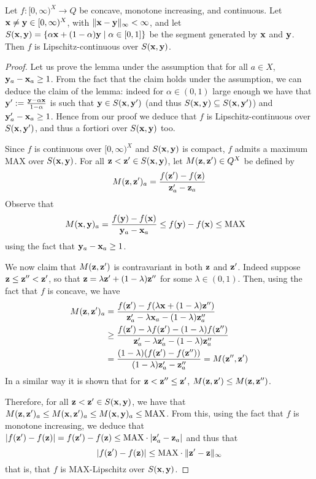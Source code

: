 \begin{lemma}\label{lm:mainLip}
Let $f: [0,\infty)^{X}\to Q$ be concave, monotone increasing, and continuous.  
Let $\mathbf{x}\neq \mathbf{y}\in [0,\infty)^{X}$, with $\|\mathbf{x}-\mathbf{y}\|_{\infty}<\infty$, and let $S(\mathbf{x}, \mathbf{y})=\{ \alpha\mathbf{x} + (1-\alpha)\mathbf{y}\mid \alpha \in [0,1]\}$ be the segment generated by $\mathbf{x}$ and $\mathbf{y}$. 
Then $f$ is Lipschitz-continuous over $S(\mathbf{x}, \mathbf{y})$.

\end{lemma}
\begin{proof}
Let us prove the lemma under the assumption that for all $a\in X$, $\mathbf{y}_{a}-\mathbf{x}_{a}\geq 1$. From the fact that the claim holds under the assumption, we can deduce the claim of the lemma:
indeed for $\alpha\in (0,1)$ large enough we have that $\mathbf{y}':= \frac{\mathbf{y}-\alpha\mathbf{x}}{1-\alpha}$ is such that $\mathbf{y}\in S(\mathbf{x}, \mathbf{y}')$ (and thus $S(\mathbf{x}, \mathbf{y})\subseteq S(\mathbf{x}, \mathbf{y}')$) and 
$\mathbf{y}'_{a}-\mathbf{x}_{a}\geq 1$. Hence from our proof we deduce that $f$ is Lipschitz-continuous over $S(\mathbf{x}, \mathbf{y}')$, and thus a fortiori over $S(\mathbf{x}, \mathbf{y})$ too.


Since $f$ is continuous over $[0,\infty)^{X}$ and $S(\mathbf{x}, \mathbf{y})$ is compact, $f$ admits a maximum $\mathrm{MAX}$ over $S(\mathbf{x}, \mathbf{y})$.
For all $\mathbf{z}< \mathbf{z}'\in S(\mathbf{x}, \mathbf{y})$, let $M(\mathbf{z}, \mathbf{z}')\in Q^{X}$ be defined by
$$
M(\mathbf{z}, \mathbf{z}')_{a}= \frac{f(\mathbf{z}')-f(\mathbf{z})}{\mathbf{z}'_{a}-\mathbf{z}_{a}}
$$
Observe that
\begin{align*}
M(\mathbf{x}, \mathbf{y})_{a} & = \frac{f(\mathbf{y})-f(\mathbf{x})}{\mathbf{y}_{a}-\mathbf{x}_{a}} \leq 
f(\mathbf{y})-f(\mathbf{x}) \leq \mathrm{MAX}
\end{align*}
using the fact that $\mathbf{y}_{a}-\mathbf{x}_{a}\geq 1$. 

We now claim that $M(\mathbf{z}, \mathbf{z}')$ is contravariant in both $\mathbf{z}$ and $\mathbf{z}'$. 
Indeed suppose $\mathbf{z}\leq \mathbf{z}'' < \mathbf{z}'$, so that $\mathbf{z}= \lambda \mathbf{z}' +(1-\lambda)\mathbf{z}''$ for some $\lambda \in (0,1)$. Then, using the fact that $f$ is concave, we have 
\begin{align*}
M(\mathbf{z}, \mathbf{z}')_{a}&=\frac{f(\mathbf{z}')-f(\lambda \mathbf{x} +(1-\lambda)\mathbf{z}'')}{\mathbf{z}'_{a}-\lambda \mathbf{x}_{a} -(1-\lambda)\mathbf{z}''_{a}} \\
&
\geq 
\frac{f(\mathbf{z}')-\lambda f(\mathbf{z}') -(1-\lambda)f(\mathbf{z}'')}{\mathbf{z}'_{a}-\lambda \mathbf{z}'_{a} -(1-\lambda)\mathbf{z}''_{a}} \\
&
= 
\frac{(1-\lambda)(f(\mathbf{z}')-f(\mathbf{z}''))}{(1-\lambda )\mathbf{z}'_{a}-\mathbf{z}''_{a}} =M(\mathbf{z}'', \mathbf{z}')
\end{align*}
In a similar way it is shown that for $\mathbf{z} < \mathbf{z}''\leq \mathbf{z}'$, $M(\mathbf{z},\mathbf{z}')\leq M(\mathbf{z}, \mathbf{z}'')$. 

Therefore, for all $\mathbf{z} < \mathbf{z}'\in S(\mathbf{x}, \mathbf{y})$, we have that $M(\mathbf{z}, \mathbf{z}')_{a} \leq M(\mathbf{x}, \mathbf{z}')_{a} \leq M(\mathbf{x}, \mathbf{y})_{a} \leq \mathrm{MAX}$. 
From this, using the fact that $f$ is monotone increasing, we deduce that 
$|f(\mathbf{z}')-f(\mathbf{z})|=f(\mathbf{z}')-f(\mathbf{z}) \leq \mathrm{MAX}\cdot |\mathbf{z}'_{a}-\mathbf{z}_{a}|
$ and thus that 
$$|f(\mathbf{z}')-f(\mathbf{z})|\leq \mathrm{MAX}\cdot \|\mathbf{z}'-\mathbf{z}\|_{\infty}$$
that is, that $f$ is $\mathrm{MAX}$-Lipschitz over $S(\mathbf{x}, \mathbf{y})$. 
\end{proof}

